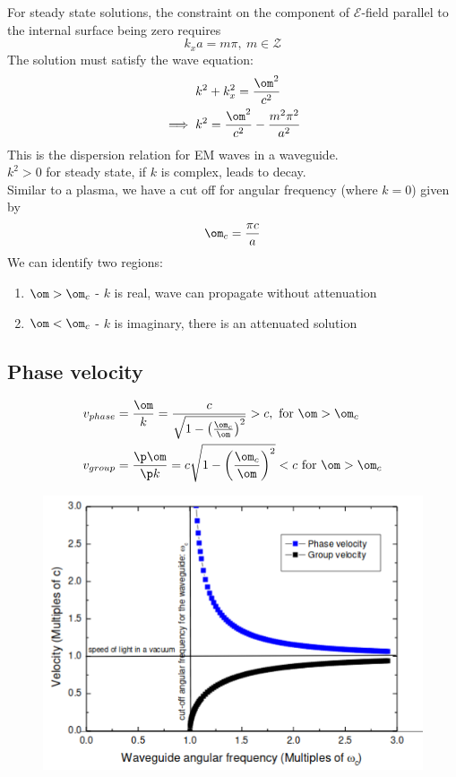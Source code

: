 \documentclass[a4paper, 11pt, normalem]{report}
\renewcommand\E{\mathcal{E}}
\begin{document}
For steady state solutions, the constraint on the component of $\E$-field parallel to the internal surface being zero requires
\begin{equation}
	k_xa = m\pi,~ m \in \mathcal{Z}
\end{equation}
The solution must satisfy the wave equation:
\begin{align}
	k^2 &+ k_x^2 = \frac{\om^2}{c^2} \\
	\implies k^2 &= \frac{\om^2}{c^2} - \frac{m^2\pi^2}{a^2}
\end{align}
This is the dispersion relation for EM waves in a waveguide. \\
$k^2 > 0$ for steady state, if $k$ is complex, leads to decay. \\
Similar to a plasma, we have a cut off for angular frequency (where $k = 0$) given by
\begin{equation}
	\om_c = \frac{\pi c}{a}
\end{equation}
We can identify two regions:
\begin{enumerate}
	\item $\om > \om_c$ - $k$ is real, wave can propagate without attenuation
	\item $\om < \om_c$ - $k$ is imaginary, there is an attenuated solution
\end{enumerate}

\subsection{Phase velocity}
\begin{align}
	v_{phase} &= \frac{\om}{k} = \frac{c}{\sqrt{1 - \left(\frac{\om_c}{\om}\right)^2}} > c, \text{ for } \om > \om_c \\
	v_{group} &= \frac{\p \om}{\p k} = c\sqrt{1 - \left(\frac{\om_c}{\om}\right)^2} < c \text{ for } \om > \om_c
\end{align}

\begin{figure}[H]
	\centering
	\includegraphics[scale=0.5]{phasegroup2.png}
\end{figure}
\end{document}
